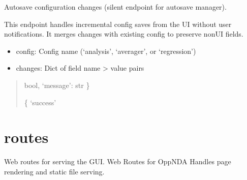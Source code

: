 \documentclass[a4paper,11pt,english,openany,oneside]{sphinxmanual}
\begin{document}
\begin{fulllineitems}
\label{\detokenize{modules/api:app.api.auto_save_config}}
\pysigstartsignatures
\pysiglinewithargsret
{}
{}
{}
\pysigstopsignatures
\sphinxAtStartPar
Auto\sphinxhyphen{}save configuration changes (silent endpoint for auto\sphinxhyphen{}save manager).

\sphinxAtStartPar
This endpoint handles incremental config saves from the UI without
user notifications. It merges changes with existing config to preserve
non\sphinxhyphen{}UI fields.
\begin{description}
\begin{itemize}
\item {} 
\sphinxAtStartPar
config: Config name (‘analysis’, ‘averager’, or ‘regression’)

\item {} 
\sphinxAtStartPar
changes: Dict of field name \sphinxhyphen{}> value pairs

\end{itemize}

\end{description}
\begin{quote}\begin{description}
\sphinxAtStartPar
bool, ‘message’: str \}

\sphinxAtStartPar
\{ ‘success’

\end{description}\end{quote}

\end{fulllineitems}



\section{routes}
\label{\detokenize{modules/api:routes}}
\sphinxAtStartPar
Web routes for serving the GUI.
\label{\detokenize{modules/api:module-app.routes}}
\sphinxAtStartPar
Web Routes for OppNDA
Handles page rendering and static file serving.
\end{document}
